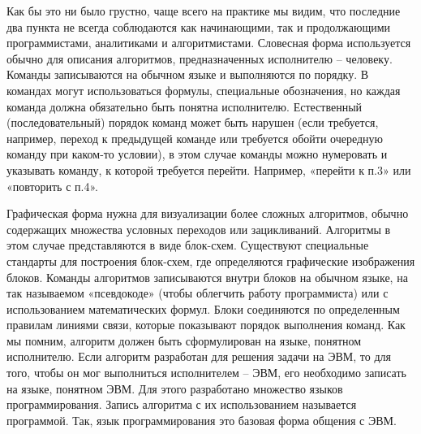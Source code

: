 \documentclass[fontsize=14bp]{report}
\begin{document}
Как бы это ни было грустно, чаще всего на практике мы видим, что последние два пункта не всегда соблюдаются как начинающими, так и продолжающими программистами, аналитиками и алгоритмистами.
Словесная форма используется обычно для описания алгоритмов, предназначенных исполнителю – человеку. Команды записываются на обычном языке и выполняются по порядку. В командах могут использоваться формулы, специальные обозначения, но каждая команда должна обязательно быть понятна исполнителю. Естественный (последовательный) порядок команд может быть нарушен (если требуется, например, переход к предыдущей команде или требуется обойти очередную команду при каком-то условии), в этом случае команды можно нумеровать и указывать команду, к которой требуется перейти. Например, «перейти к п.3» или «повторить с п.4».

Графическая форма нужна для визуализации более сложных алгоритмов, обычно содержащих множества условных переходов или зацикливаний. Алгоритмы в этом случае представляются в виде блок-схем. Существуют специальные стандарты для построения блок-схем, где определяются графические изображения блоков. Команды алгоритмов записываются внутри блоков на обычном языке, на так называемом «псевдокоде» (чтобы облегчить работу программиста) или с использованием математических формул. Блоки соединяются по определенным правилам линиями связи, которые показывают порядок выполнения команд. Как мы помним, алгоритм должен быть сформулирован на языке, понятном исполнителю. Если алгоритм разработан для решения задачи на ЭВМ, то для того, чтобы он мог выполниться исполнителем – ЭВМ, его необходимо записать на языке, понятном ЭВМ. Для этого разработано множество языков программирования. Запись алгоритма с их использованием называется программой. Так, язык программирования это базовая форма общения с ЭВМ.
\end{document}
